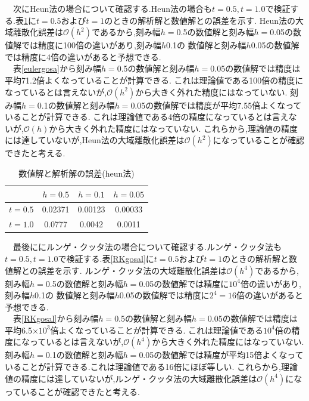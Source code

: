 \documentclass[dvipdfmx]{jarticle}
\begin{document}
  　次にHeun法の場合について確認する.Heun法の場合も$t=0.5,t=1.0$で検証する.表\ref{heungosa}に$t=0.5$および$t=1$のときの解析解と数値解との誤差を示す.
  Heun法の大域離散化誤差は$\mathcal{O}(h^2)$であるから,刻み幅$h=$0.5の数値解と刻み幅$h=$0.05の数値解では精度に100倍の違いがあり,刻み幅$h$0.1の
  数値解と刻み幅$h$0.05の数値解では精度に4倍の違いがあると予想できる.\\
  　表\ref{eulergosa}から刻み幅$h=$0.5の数値解と刻み幅$h=$0.05の数値解では精度は平均71.2倍よくなっていることが計算できる.
  これは理論値である100倍の精度になっているとは言えないが,$\mathcal{O}(h^2)$から大きく外れた精度にはなっていない.
  刻み幅$h=$0.1の数値解と刻み幅$h=$0.05の数値解では精度が平均7.55倍よくなっていることが計算できる.
  これは理論値である4倍の精度になっているとは言えないが,$\mathcal{O}(h)$から大きく外れた精度にはなっていない.
  これらから,理論値の精度には達していないが,Heun法の大域離散化誤差は$\mathcal{O}(h^2)$になっていることが確認できたと考える.

  \begin{table}[H]
    \caption{数値解と解析解の誤差(heun法)}
  \label{heungosa}
  \begin{center}
      \begin{tabular}{c|c|c|c}\hline 
        & $h=0.5$ & $h=0.1$ & $h=0.05$ \\ \hline \hline 
        $t=0.5$ & 0.02371 & 0.00123 & 0.00033 \\ 
        $t=1.0$ & 0.0777 & 0.0042 & 0.0011 \\ \hline
      \end{tabular}
  \end{center}
  \end{table}    

  　最後ににルンゲ・クッタ法の場合について確認する.ルンゲ・クッタ法も$t=0.5,t=1.0$で検証する.表\ref{RKgosal}に$t=0.5$および$t=1$のときの解析解と数値解との誤差を示す.
  ルンゲ・クッタ法の大域離散化誤差は$\mathcal{O}(h^4)$であるから,刻み幅$h=$0.5の数値解と刻み幅$h=$0.05の数値解では精度に$10^4$倍の違いがあり,刻み幅$h$0.1の
  数値解と刻み幅$h$0.05の数値解では精度に$2^4=16$倍の違いがあると予想できる.\\
  　表\ref{RKgosal}から刻み幅$h=$0.5の数値解と刻み幅$h=$0.05の数値解では精度は平均6.5$\times10^3$倍よくなっていることが計算できる.
  これは理論値である$10^4$倍の精度になっているとは言えないが,$\mathcal{O}(h^4)$から大きく外れた精度にはなっていない.
  刻み幅$h=$0.1の数値解と刻み幅$h=$0.05の数値解では精度が平均15倍よくなっていることが計算できる.これは理論値である16倍にほぼ等しい.
  これらから,理論値の精度には達していないが,ルンゲ・クッタ法の大域離散化誤差は$\mathcal{O}(h^4)$になっていることが確認できたと考える.
\end{document}

